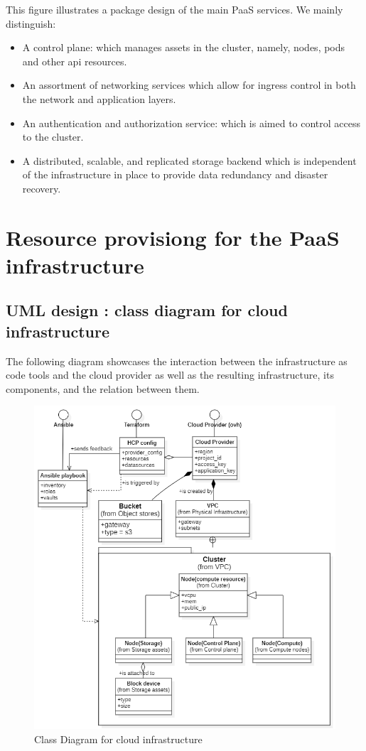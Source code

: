 This figure illustrates a package design of the main PaaS services. We mainly distinguish: 
\begin{itemize}[label={--}]
\item  A control plane: which manages assets in the cluster, namely, nodes, pods and other api resources. 
\item An assortment of networking services which allow for ingress control in both the network and application layers. 
\item An authentication and authorization service: which is aimed to control access to the cluster. 
\item A distributed, scalable, and replicated storage backend which is independent of the infrastructure in place to provide data redundancy and disaster recovery. 
\end{itemize}
\newpage
\section{Resource provisiong for the PaaS infrastructure}
\subsection{UML design : class diagram for cloud infrastructure }
The following diagram showcases the interaction between the infrastructure as code tools and the cloud provider as well as the resulting infrastructure, its components, and the relation between them. 
\begin{figure}[H]\centering
\includegraphics[width=1.0\textwidth,angle=00]{assets/f13.png}
\caption{Class Diagram for cloud infrastructure}
\label{fig:fig13}
\end{figure}

